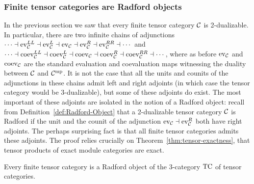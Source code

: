 \documentclass{amsart}
\begin{document}
\subsubsection{Finite tensor categories are Radford objects} \label{sec:finiteradford}

In the previous section we saw that every finite tensor category $\mathcal C$ is 2-dualizable.  In particular, there are two infinite chains of adjunctions $\cdots \dashv \mathrm{ev}_\mathcal C^{LL} \dashv \mathrm{ev}_\mathcal C^L \dashv \mathrm{ev}_\mathcal C \dashv \mathrm{ev}_\mathcal C^R \dashv \mathrm{ev}_\mathcal C^{RR} \dashv \cdots$ and $\cdots \dashv \mathrm{coev}_\mathcal C^{LL} \dashv \mathrm{coev}_\mathcal C^L \dashv \mathrm{coev}_\mathcal C \dashv \mathrm{coev}_\mathcal C^R \dashv \mathrm{coev}_\mathcal C^{RR} \dashv \cdots$, where as before $\mathrm{ev}_\mathcal C$ and $\mathrm{coev}_\mathcal C$ are the standard evaluation and coevaluation maps witnessing the duality between $\mathcal C$ and $\mathcal C^{\mathrm{mp}}$.  It is not the case that all the units and counits of the adjunctions in these chains admit left and right adjoints (in which case the tensor category would be 3-dualizable), but some of these adjoints do exist.  The most important of these adjoints are isolated in the notion of a Radford object: recall from Definition~\ref{def:Radford-Object} that a 2-dualizable tensor category $\mathcal C$ is Radford if the unit and the counit of the adjunction $\mathrm{ev}_\mathcal C \dashv \mathrm{ev}_\mathcal C^R$ both have right adjoints.  The perhaps surprising fact is that all finite tensor categories admits these adjoints.  The proof relies crucially on Theorem~\ref{thm:tensor-exactness}, that tensor products of exact module categories are exact.
\begin{theorem} \label{thm:TCisRadford}
Every finite tensor category is a Radford object of the 3-category $\mathrm{TC}$ of tensor categories.
\end{theorem}
\end{document}
